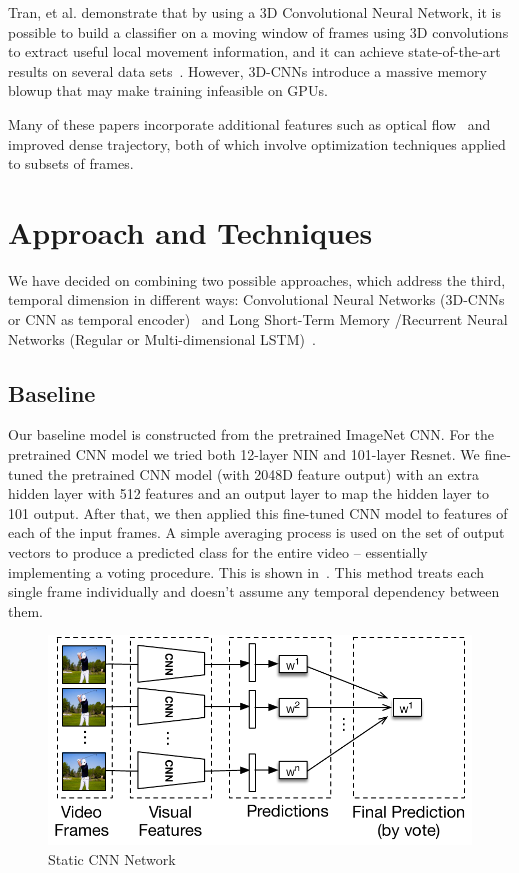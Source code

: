 Tran, et al. demonstrate that by using a 3D Convolutional Neural Network, it is possible to build a classifier on a moving window of frames using 3D convolutions to extract useful local movement information, and it can achieve state-of-the-art results on several data sets~\cite{stf}. However, 3D-CNNs introduce a massive memory blowup that may make training infeasible on GPUs.

Many of these papers incorporate additional features such as optical flow~\cite{brox} and improved dense trajectory, both of which involve optimization techniques applied to subsets of frames. 

\section{Approach and Techniques}
We have decided on combining two possible approaches, which address
the third, temporal dimension in different ways: Convolutional Neural
Networks (3D-CNNs or CNN as temporal encoder)~\cite{stf,cnnvid,cnnMNLS} and Long
Short-Term Memory /Recurrent Neural Networks (Regular or Multi-dimensional LSTM)~\cite{ltrcn}. 

\subsection{Baseline}
Our baseline model is constructed from the pretrained ImageNet CNN. For the pretrained CNN model we tried both 12-layer NIN and 101-layer Resnet. We fine-tuned the pretrained CNN model (with 2048D feature output) with an extra hidden layer with 512 features and an output layer to map the hidden layer to 101 output. After that, we then applied this fine-tuned CNN model to features of each of the input frames. A simple averaging process is used on the set of output vectors to produce a predicted class for the entire video -- essentially implementing a voting procedure. This is shown in~. This method treats each single frame individually and doesn't assume any temporal dependency between them. 
\begin{figure}
  \centering
  \includegraphics[width=1.0\linewidth]{figs/cnn}
  \caption{Static CNN Network}
  \label{fig:cnn}
\end{figure}

